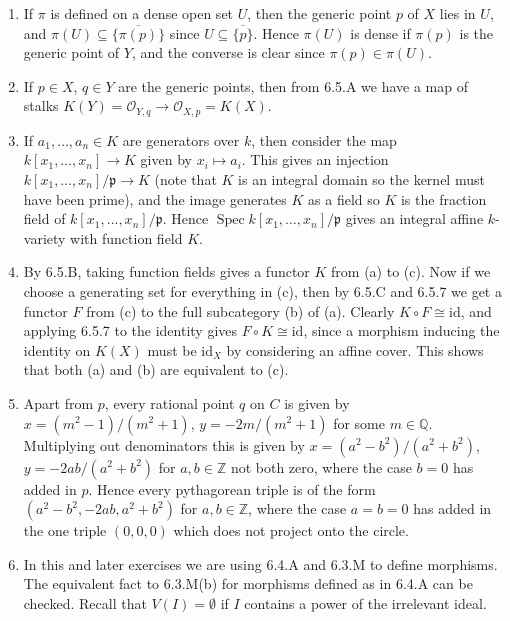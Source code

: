 \documentclass{report}
\newcommand{\closure}[1]{\overline{#1}} %
\newcommand{\id}{{\mathrm{id}}} %
\newcommand{\p}{\mathfrak{p}}
\renewcommand{\O}{\mathscr{O}} %
\newcommand{\Z}{\mathbb{Z}}
\newcommand{\Q}{\mathbb{Q}}
\DeclareMathOperator{\Spec}{Spec}
\begin{document}
\begin{enumerate}[label=\textbf{6.5.\Alph*.}]
	\item If $\pi$ is defined on a dense open set $U$, then the generic point
	      $p$ of $X$ lies in $U$, and $\pi(U)\subseteq\closure{\{\pi(p)\}}$ since
	      $U\subseteq\closure{\{p\}}$. Hence $\pi(U)$ is dense if $\pi(p)$ is the
	      generic point of $Y$, and the converse is clear since $\pi(p)\in\pi(U)$.

	\item If $p\in X$, $q\in Y$ are the generic points, then from 6.5.A we have
	      a map of stalks $K(Y)=\O_{Y,q}\to\O_{X,p}=K(X)$.

	\item If $a_1,\ldots,a_n\in K$ are generators over $k$, then consider the
	      map $k[x_1,\ldots,x_n]\to K$ given by $x_i\mapsto a_i$. This gives an
	      injection $k[x_1,\ldots,x_n]/\p\to K$ (note that $K$ is an integral
	      domain so the kernel must have been prime), and the image generates
	      $K$ as a field so $K$ is the fraction field of $k[x_1,\ldots,x_n]/\p$.
	      Hence $\Spec k[x_1,\ldots,x_n]/\p$ gives an integral affine
	      $k$-variety with function field $K$.

	\item By 6.5.B, taking function fields gives a functor $K$ from (a) to (c).
	      Now if we choose a generating set for everything in (c), then by 6.5.C
	      and 6.5.7 we get a functor $F$ from (c) to the full subcategory (b) of
	      (a). Clearly $K\circ F\cong\id$, and applying 6.5.7 to the identity
	      gives $F\circ K\cong\id$, since a morphism inducing the identity on
	      $K(X)$ must be $\id_X$ by considering an affine cover. This shows that
	      both (a) and (b) are equivalent to (c).

	\item Apart from $p$, every rational point $q$ on $C$ is given by
	      $x=(m^2-1)/(m^2+1)$, $y=-2m/(m^2+1)$ for some $m\in\Q$. Multiplying
	      out denominators this is given by $x=(a^2-b^2)/(a^2+b^2)$,
	      $y=-2ab/(a^2+b^2)$ for $a,b\in\Z$ not both zero, where the case $b=0$
	      has added in $p$. Hence every pythagorean triple is of the form
	      $(a^2-b^2,-2ab,a^2+b^2)$ for $a,b\in\Z$, where the case $a=b=0$ has
	      added in the one triple $(0,0,0)$ which does not project onto the
	      circle.

	\item In this and later exercises we are using 6.4.A and 6.3.M to define
	      morphisms. The equivalent fact to 6.3.M(b) for morphisms defined as in
	      6.4.A can be checked. Recall that $V(I)=\emptyset$ if $I$ contains a
	      power of the irrelevant ideal.


\end{enumerate}
\end{document}
